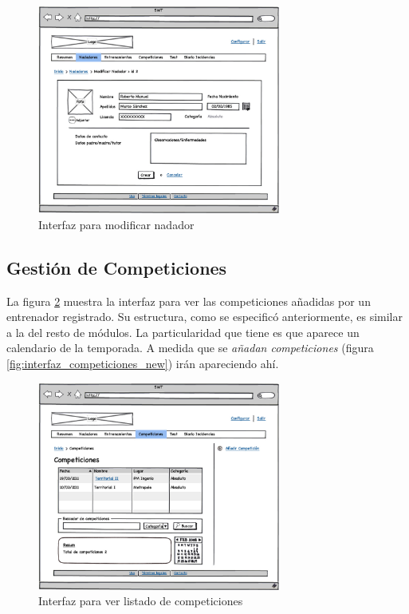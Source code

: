 	\begin{figure}[H]
	  \centering
	    \includegraphics[width=8cm]{./eps/p_interfaz/13_Nadadores_modif.eps}
	  \caption{Interfaz para modificar nadador}
	  \label{fig:interfaz_nadadores_modif}
	\end{figure}
	
	\subsection{Gestión de Competiciones} %
		\label{sub:gestion_de_competiciones}
	
	La figura \ref{fig:interfaz_competiciones} muestra la interfaz para ver las competiciones añadidas por un entrenador registrado. Su estructura, como se especificó anteriormente, es similar a la del resto de módulos. La particularidad que tiene es que aparece un calendario de la temporada. A medida que se {\it añadan competiciones} (figura \ref{fig:interfaz_competiciones_new}) irán apareciendo ahí. 
	
		\begin{figure}[H]
		  \centering
		    \includegraphics[width=8cm]{./eps/p_interfaz/14_Competiciones.eps}
		  \caption{Interfaz para ver listado de competiciones}
		  \label{fig:interfaz_competiciones}
		\end{figure}

